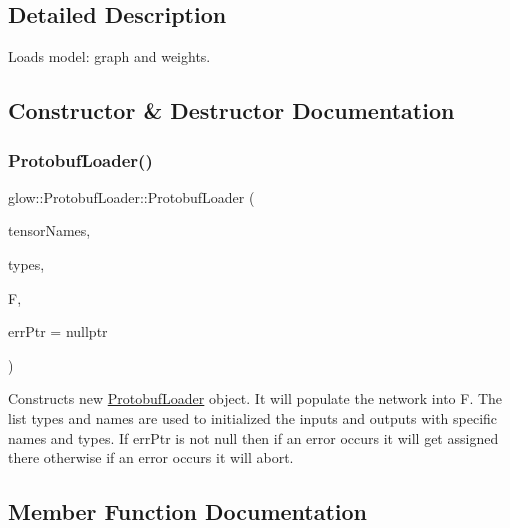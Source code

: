 \subsection{Detailed Description}
Loads model\+: graph and weights. 

\subsection{Constructor \& Destructor Documentation}
\mbox{\label{classglow_1_1_protobuf_loader_aebda831dd716c8c1056f520783a062ac}} 
\subsubsection{\texorpdfstring{Protobuf\+Loader()}{ProtobufLoader()}}
{\footnotesize\ttfamily glow\+::\+Protobuf\+Loader\+::\+Protobuf\+Loader (\begin{DoxyParamCaption}\item[{llvm\+::\+Array\+Ref$<$ const char $\ast$$>$}]{tensor\+Names,  }\item[{llvm\+::\+Array\+Ref$<$ \hyperlink{structglow_1_1_type}{Type\+Ref} $>$}]{types,  }\item[{\hyperlink{classglow_1_1_function}{Function} \&}]{F,  }\item[{\hyperlink{namespaceglow_afdb176c3a672ef66db0ecfc19a8d39bf}{Error} $\ast$}]{err\+Ptr = {\ttfamily nullptr} }\end{DoxyParamCaption})}

Constructs new \hyperlink{classglow_1_1_protobuf_loader}{Protobuf\+Loader} object. It will populate the network into {\ttfamily F}. The list {\ttfamily types} and {\ttfamily names} are used to initialized the inputs and outputs with specific names and types. If {\ttfamily err\+Ptr} is not null then if an error occurs it will get assigned there otherwise if an error occurs it will abort. 

\subsection{Member Function Documentation}
\mbox{\label{classglow_1_1_protobuf_loader_ab6c3cd81547d30058fc6061e31353289}} 
